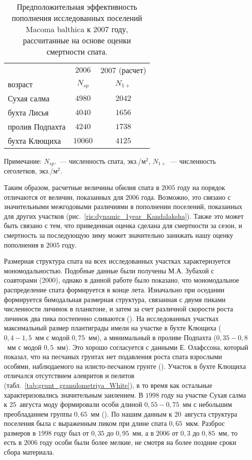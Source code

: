 \begin{table}[p]
\caption{Предположительная эффективность пополнения исследованных поселений Macoma balthica к 2007 году, рассчитанные на основе оценки смертности спата.}
\label{tab:N1_rasschet}
\begin{center}
\begin{tabular}{|l|c|c|}
\hline
                & $2006$  & $2007$ (расчет) \\
возраст         & $N_{sp}$      & $N_{1+}$  \\ \hline
Сухая салма     & $4980$  & $2042$          \\ \hline
бухта Лисья     & $4040$  & $1656$          \\ \hline
пролив Подпахта & $4240$  & $1738$          \\ \hline
бухта Клющиха   & $10060$ & $4125$         \\ \hline
\end{tabular}
\end{center}
	\footnotesize{Примечание: $N_{sp}$.~--- численность спата, экз./м$^2$, $N_{1+}$~--- численность сеголетков, экз./м$^2$.}
\end{table}

Таким образом, расчетные величины обилия спата в $2005$ году на порядок отличаются от величин, показанных для $2006$ года. 
Возможно, это связано с значительными межгодовыми различиями в пополнении поселений, показанных для других участков (рис.~\ref{ris:dynamic_1year_Kandalaksha}). 
Также это может быть связано с тем, что приведенная оценка сделана для смертности за сезон, и смертность за последующую зиму может значительно занижать нашу оценку пополнения в $2005$ году. 

Размерная структура спата на всех исследованных участках характеризуется мономодальностью. 
Подобные данные были получены М.А. Зубахой с соавторами (2000), однако в данной работе было показано, что мономодальное распределение спата формируется в конце лета. 
Изначально при оседании формируется бимодальная размерная структура, связанная с двумя пиками численности личинок в планктоне, и затем за счет различной скорости роста личинок два пика постепенно сливаются (\cite{Zubakha_et_al_2000}).
На исследованных участках максимальный размер плантиграды имели на участке в бухте Клющиха ($0,4 - 1,5$~мм с модой $0,75$~мм), а минимальный в проливе Подпахта ($0,35 - 0,8$~мм с модой $0,5$~мм). 
Это хорошо согласуется с данными Е. Олафссона, который показал, что на песчаных грунтах нет подавления роста спата взрослыми особями, наблюдаемого на илисто-песчаном грунте (\cite{Olafsson_1989}). 
Участок в бухте Клющиха отличался отсутствием алевритов и пелитов (табл.~\ref{tab:grunt_granulometriya_White}), в то время как остальные характеризовались значительным заилением. 
В $1998$ году на участке Сухая салма к $25$~августа моду формировали особи длиной $0,55 - 0,75$~мм с небольшим преобладанием группы $0,65$~мм (\cite{Zubakha_et_al_2000}). 
По нашим данным к $20$~августа структура поселения была с выраженным пиком при длине спата $0,65$~мкм. 
Разброс размеров в $1998$ году был от $0,35$ до $0,95$~мм, а в $2006$ от $0,3$ до $0,85$~мм, то есть в $2006$ году особи были более мелкие, не смотря на более поздние сроки сбора материала. 

